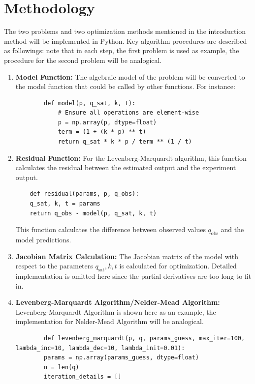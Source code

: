 \documentclass[12pt]{article} %
\begin{document}
\section{Methodology}
The two problems and two optimization methods mentioned in the introduction method will be implemented in Python. Key algorithm procedures are described as followings: note that in each step, the
first problem is used as example, the procedure for the second problem will be analogical. 
\begin{enumerate}
    \item \textbf{Model Function:} The algebraic model of the problem will be converted to the model function that could be called by other functions. For instance:
    \begin{lstlisting}
        def model(p, q_sat, k, t):
            # Ensure all operations are element-wise
            p = np.array(p, dtype=float)
            term = (1 + (k * p) ** t)
            return q_sat * k * p / term ** (1 / t)
        \end{lstlisting}

    \item \textbf{Residual Function:} For the Levenberg-Marquardt algorithm, this function calculates the residual between the estimated output and the experiment output.
    \begin{lstlisting}
    def residual(params, p, q_obs):
    q_sat, k, t = params
    return q_obs - model(p, q_sat, k, t)
    \end{lstlisting}
    This function calculates the difference between observed values \( q_{\text{obs}} \) and the model predictions.

    \item \textbf{Jacobian Matrix Calculation:}
    The Jacobian matrix of the model with respect to the parameters \( q_{\text{sat}}, k, t \) is calculated for optimization. Detailed implementation is omitted here since the partial derivatives are too long to fit in.

    \item \textbf{Levenberg-Marquardt Algorithm/Nelder-Mead Algorithm:} Levenberg-Marquardt Algorithm is shown here as an example, the implementation for Nelder-Mead Algorithm will be analogical.
    
    \begin{lstlisting}
        def levenberg_marquardt(p, q, params_guess, max_iter=100, lambda_inc=10, lambda_dec=10, lambda_init=0.01):
        params = np.array(params_guess, dtype=float)
        n = len(q)
        iteration_details = []
    

\end{lstlisting}
\end{enumerate}
\end{document}
